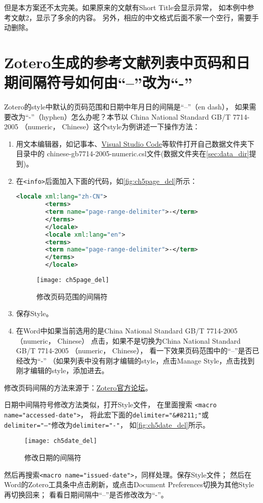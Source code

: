 \documentclass[theorem=false,mathfont=none,openany,sub3section]{easybook}
\begin{document}
{但是本方案还不太完美。如果原来的文献有Short Title会显示异常，
如本例中参考文献2，显示了多余的内容。
另外，相应的中文格式后面不家一个空行，需要手动删除。

\section{Zotero生成的参考文献列表中页码和日期间隔符号如何由“–”改为“-”}\label{sec:DashToHyphen}		
Zotero的style中默认的页码范围和日期中年月日的间隔是“–”（en dash），
如果需要改为“-”（hyphen）怎么办呢？本节以
China National Standard GB/T 7714-2005 （numeric， Chinese）这个style为例讲述一下操作方法：
\begin{enumerate}
	\item 用文本编辑器，如记事本、\href{https://code.visualstudio.com/}{Visual Studio Code}等软件打开自己数据文件夹下目录中的
	chinese-gb7714-2005-numeric.csl文件(数据文件夹在\cref{sec:data_dir}提到)。
	\item 在\verb|<info>|后面加入下面的代码，如\autoref{fig:ch5page_del}所示：
	
	\begin{lstlisting}[language=XML]	
		<locale xml:lang="zh-CN">
		<terms>
		<term name="page-range-delimiter">-</term>
		</terms>
		</locale>
		<locale xml:lang="en">
		<terms>
		<term name="page-range-delimiter">-</term>
		</terms>
		</locale>
	\end{lstlisting}				
	\begin{figure}[ht]
		\centering
		\texttt{[image: ch5page\_del]}
		\caption{修改页码范围的间隔符}
		\label{fig:ch5page_del}
	\end{figure}
	\item 保存Style。
	\item 在Word中如果当前选用的是China National Standard GB/T 7714-2005 （numeric， Chinese）
	点击，如果不是切换为China National Standard GB/T 7714-2005 （numeric， Chinese），
	看一下效果页码范围中的“–”是否已经改为“-”
	（如果列表中没有刚才编辑的style，点击Manage Style，点击\menu{+}找到刚才编辑的style，添加进去。
\end{enumerate}

修改页码间隔的方法来源于：\href{https://forums.zotero.org/discussion/comment/320230#Comment_320230}
{Zotero官方论坛}。

日期中间隔符号修改方法类似，打开Style文件，
在里面搜索 \verb|<macro name="accessed-date">|，
将此宏下面的\verb|delimiter="&#8211;"|或\verb|delimiter="–"|修改为\verb|delimiter="-"|，
如\autoref{fig:ch5date_del}所示。
\begin{figure}[ht]
	\centering
	\texttt{[image: ch5date\_del]}
	\caption{修改日期的间隔符}
	\label{fig:ch5date_del}
\end{figure}
然后再搜索\verb|<macro name="issued-date">|，同样处理。保存Style文件；
然后在Word的Zotero工具条中点击刷新，或点击Document Preferences切换为其他Style再切换回来；		
看看日期间隔中“–”是否修改改为“-”。

}
\end{document}
